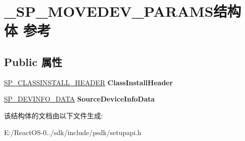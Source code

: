 \hypertarget{struct___s_p___m_o_v_e_d_e_v___p_a_r_a_m_s}{}\section{\+\_\+\+S\+P\+\_\+\+M\+O\+V\+E\+D\+E\+V\+\_\+\+P\+A\+R\+A\+M\+S结构体 参考}
\label{struct___s_p___m_o_v_e_d_e_v___p_a_r_a_m_s}
\subsection*{Public 属性}
\begin{DoxyCompactItemize}
\item 
\mbox{\label{struct___s_p___m_o_v_e_d_e_v___p_a_r_a_m_s_ae0dfc834e0629a697d49f776489ec3bf}} 
\hyperlink{struct___s_p___c_l_a_s_s_i_n_s_t_a_l_l___h_e_a_d_e_r}{S\+P\+\_\+\+C\+L\+A\+S\+S\+I\+N\+S\+T\+A\+L\+L\+\_\+\+H\+E\+A\+D\+ER} {\bfseries Class\+Install\+Header}
\item 
\mbox{\label{struct___s_p___m_o_v_e_d_e_v___p_a_r_a_m_s_a7d458e34a1b2b07dc7c96e4a03ae141a}} 
\hyperlink{struct___s_p___d_e_v_i_n_f_o___d_a_t_a}{S\+P\+\_\+\+D\+E\+V\+I\+N\+F\+O\+\_\+\+D\+A\+TA} {\bfseries Source\+Device\+Info\+Data}
\end{DoxyCompactItemize}


该结构体的文档由以下文件生成\+:\begin{DoxyCompactItemize}
\item 
E\+:/\+React\+O\+S-\/0../sdk/include/psdk/setupapi.\+h\end{DoxyCompactItemize}
